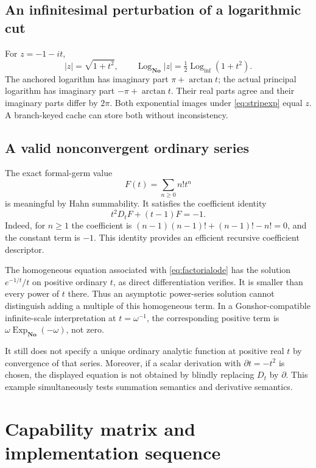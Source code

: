 \documentclass[11pt,letterpaper]{article}
\theoremstyle{definition}
\newcommand{\No}{\mathbf{No}}
\newcommand{\ExpNo}{\operatorname{Exp}_{\No}}
\newcommand{\LogNo}{\operatorname{Log}_{\No}}
\newcommand{\Logi}{\operatorname{Log}_{\mathrm{inf}}}
\numberwithin{equation}{section}
\begin{document}
\subsection{An infinitesimal perturbation of a logarithmic cut}
For $z=-1-it$,
\[
 |z|=\sqrt{1+t^2},\qquad
 \LogNo|z|=\tfrac12\Logi(1+t^2).
\]
The anchored logarithm has imaginary part $\pi+\arctan t$; the actual principal logarithm has imaginary part $-\pi+\arctan t$. Their real parts agree and their imaginary parts differ by $2\pi$. Both exponential images under \eqref{eq:stripexp} equal $z$. A branch-keyed cache can store both without inconsistency.

\subsection{A valid nonconvergent ordinary series}
The exact formal-germ value
\[
 F(t)=\sum_{n\ge0}n!t^n
\]
is meaningful by Hahn summability. It satisfies the coefficient identity
\begin{equation}\label{eq:factorialode}
 t^2D_tF+(t-1)F=-1.
\end{equation}
Indeed, for $n\ge1$ the coefficient is $(n-1)(n-1)!+(n-1)!-n!=0$, and the constant term is $-1$. This identity provides an efficient recursive coefficient descriptor.

The homogeneous equation associated with \eqref{eq:factorialode} has the solution $e^{-1/t}/t$ on positive ordinary $t$, as direct differentiation verifies. It is smaller than every power of $t$ there. Thus an asymptotic power-series solution cannot distinguish adding a multiple of this homogeneous term. In a Gonshor-compatible infinite-scale interpretation at $t=\omega^{-1}$, the corresponding positive term is $\omega\ExpNo(-\omega)$, not zero.

It still does not specify a unique ordinary analytic function at positive real $t$ by convergence of that series. Moreover, if a scalar derivation with $\partial t=-t^2$ is chosen, the displayed equation is not obtained by blindly replacing $D_t$ by $\partial$. This example simultaneously tests summation semantics and derivative semantics.

\section{Capability matrix and implementation sequence}\label{sec:roadmap}
\end{document}
